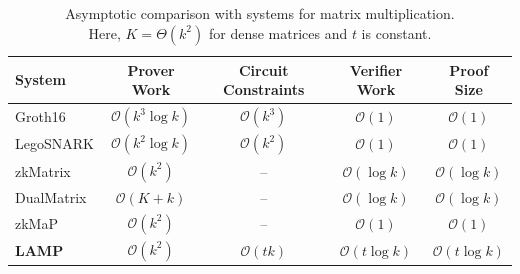 \begin{table}[t]
\centering
\footnotesize
  \ifshowrevisions
  \fi
\setlength{\tabcolsep}{4pt}
\label{tab:asymptotic_comparison}
\begin{tabular}{lcccc}
\toprule
\textbf{System} &
\textbf{Prover Work} &
\textbf{Circuit Constraints} &
\textbf{Verifier Work} &
\textbf{Proof Size} \\
\midrule
Groth16
& $\mathcal{O}(k^3 \log k)$
& $\mathcal{O}(k^3)$
& $\mathcal{O}(1)$
& $\mathcal{O}(1)$ \\
    LegoSNARK
    & $\mathcal{O}(k^2 \log k)$
    & $\mathcal{O}(k^2)$
    & $\mathcal{O}(1)$
    & $\mathcal{O}(1)$ \\

    zkMatrix
    & $\mathcal{O}(k^2)$
    & -- 
    & $\mathcal{O}(\log k)$
    & $\mathcal{O}(\log k)$ \\

    DualMatrix
    & $\mathcal{O}(K+k)$
    & --
    & $\mathcal{O}(\log k)$
    & $\mathcal{O}(\log k)$ \\

    zkMaP
    & $\mathcal{O}(k^2)$
    & --
    & $\mathcal{O}(1)$
    & $\mathcal{O}(1)$ \\

    \textbf{LAMP}
    & $\mathcal{O}(k^2)$
    & $\mathcal{O}(tk)$
    & $\mathcal{O}(t\log k)$
    & $\mathcal{O}(t\log k)$ \\
    \bottomrule
\end{tabular}
\vspace{4pt}
\caption{Asymptotic comparison with systems for matrix multiplication. \\
Here, $K=\Theta(k^2)$ for dense matrices and $t$ is constant.}
\end{table}
